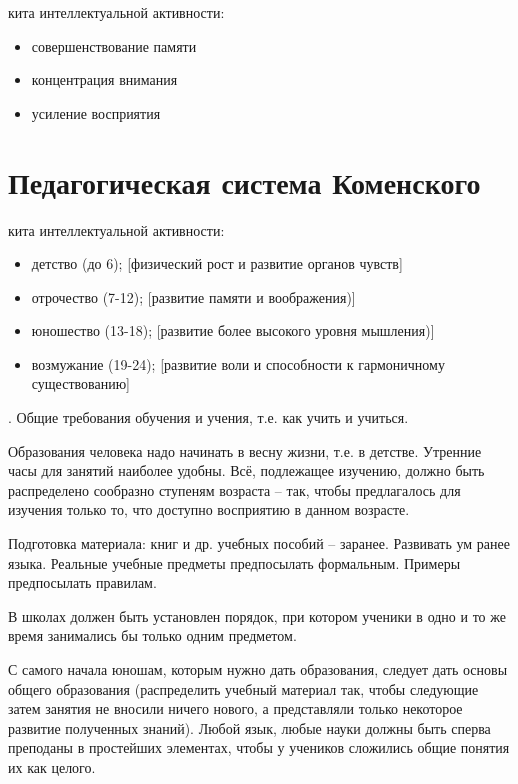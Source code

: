 \documentclass[12pt]{article}			%
\begin{document}
	{ кита интеллектуальной активности:}
	
	\begin{itemize}
		\item совершенствование памяти
		\item концентрация внимания
		\item усиление восприятия
	\end{itemize}
	
	\section{Педагогическая система Коменского}
	
	{ кита интеллектуальной активности:}
	
	\begin{itemize}
		\item детство (до 6);		[физический рост и развитие органов чувств]
		\item отрочество (7-12);	[развитие памяти и воображения)]
		\item юношество (13-18);	[развитие более высокого уровня мышления)]
		\item возмужание (19-24);	[развитие воли и способности к гармоничному существованию]
	\end{itemize}
	
	{. Общие требования обучения и учения, т.е. как учить и учиться.}
	
	{}
	Образования человека надо начинать в весну жизни, т.е. в детстве.
	Утренние часы для занятий наиболее удобны.
	Всё, подлежащее изучению, должно быть распределено сообразно ступеням возраста – так, чтобы предлагалось для изучения только то, что доступно восприятию в данном возрасте.
	
	{}
	Подготовка материала: книг и др. учебных пособий – заранее.
	Развивать ум ранее языка.
	Реальные учебные предметы предпосылать формальным.
	Примеры предпосылать правилам.
	
	{}
	В школах должен быть установлен порядок, при котором ученики в одно и то же время занимались бы только одним предметом.
	
	{}
	С самого начала юношам, которым нужно дать образования, следует дать основы общего образования (распределить учебный материал так, чтобы следующие затем занятия не вносили ничего нового, а представляли только некоторое развитие полученных знаний).
	Любой язык, любые науки должны быть сперва преподаны в простейших элементах, чтобы у учеников сложились общие понятия их как целого.
	
\end{document}
